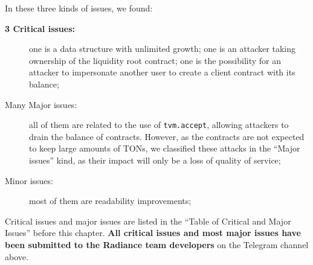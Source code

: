 In these three kinds of issues, we found:
\begin{description}
\item[{\bf 3 Critical issues:}] one is a data structure with unlimited growth; one is an attacker taking ownership of the liquidity root contract; one is the possibility for an attacker to impersonate another user to create a client contract with its balance;
\item[Many Major issues:] all of them are related to the use of {\tt tvm.accept}, allowing attackers to drain the balance of contracts. However, as the contracts are not expected to keep large amounts of TONs, we classified these attacks in the ``Major issues'' kind, as their impact will only be a loss of quality of service;
\item[Minor issues:] most of them are readability improvements;
\end{description}

Critical issues and major issues are listed in the ``Table of Critical
and Major Issues'' before this chapter. {\bf All critical issues and
most major issues have been submitted to the Radiance team developers}
on the Telegram channel above.
